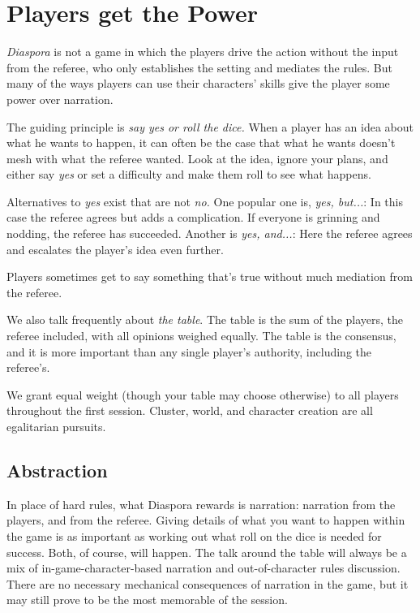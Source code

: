 \section{Players get the Power}\label{sec:players-get-the-power}
\vfil

\emph{Diaspora} is not a game in which the players drive the action without the input from the referee, who only establishes the setting and mediates the rules.  But many of the ways players can use their characters' skills give the player some power over narration.

The guiding principle is \emph{say yes or roll the dice.} When a player has an idea about what he wants to happen, it can often be the case that what he wants doesn't mesh with what the referee wanted. Look at the idea, ignore your plans, and either say \emph{yes} or set a difficulty and make them roll to see what happens.

\vfil

Alternatives to \emph{yes} exist that are not \emph{no.} One popular one is, \emph{yes, but...}: In this case the referee agrees but adds a complication. If everyone is grinning and nodding, the referee has succeeded. Another is \emph{yes, and...}: Here the referee agrees and escalates the player's idea even further.

Players sometimes get to say something that's true without much mediation from the referee.

We also talk frequently about \emph{the table}. The table is the sum of the players, the referee included, with all opinions weighed equally. The table is the consensus, and it is more important than any single player's authority, including the referee's.


We grant equal weight (though your table may choose otherwise) to all players throughout the first session. Cluster, world, and character creation are all egalitarian pursuits.

\subsection{Abstraction}
\label{sec:abstraction}
\vfil

% 

In place of hard rules, what Diaspora rewards is narration: narration from the players, and from the referee. Giving details of what you want to happen within the game is as important as working out what roll on the dice is needed for success. Both, of course, will happen. The talk around the table will always be a mix of in-game-character-based narration and out-of-character rules discussion. There are no necessary mechanical consequences of narration in the game, but it may still prove to be the most memorable of the session.

